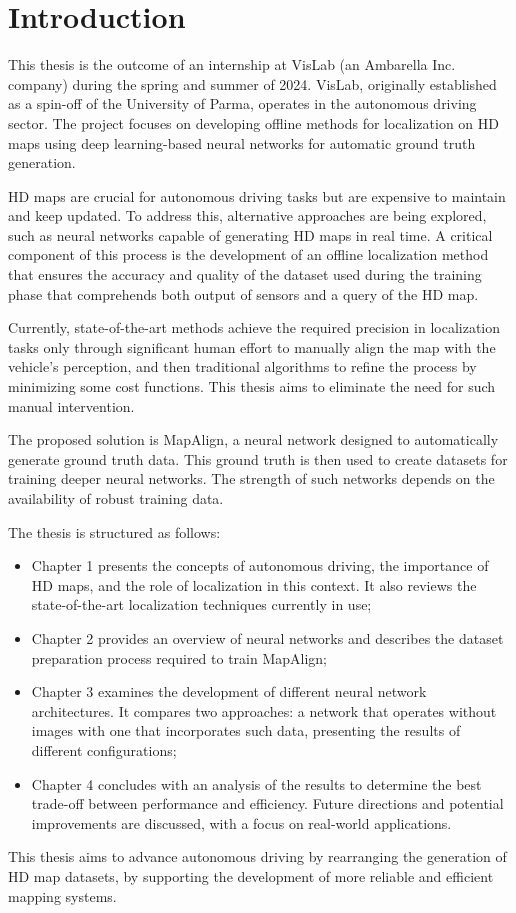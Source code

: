 \chapter*{Introduction}

This thesis is the outcome of an internship at VisLab (an Ambarella Inc. company) during the spring and summer of 2024. VisLab, originally established as a spin-off of the University of Parma, operates in the autonomous driving sector. The project focuses on developing offline methods for localization on HD maps using deep learning-based neural networks for automatic ground truth generation.

HD maps are crucial for autonomous driving tasks but are expensive to maintain and keep updated. To address this, alternative approaches are being explored, such as neural networks capable of generating HD maps in real time. A critical component of this process is the development of an offline localization method that ensures the accuracy and quality of the dataset used during the training phase that comprehends both output of sensors and a query of the HD map.

Currently, state-of-the-art methods achieve the required precision in localization tasks only through significant human effort to manually align the map with the vehicle’s perception, and then traditional algorithms to refine the process by minimizing some cost functions. This thesis aims to eliminate the need for such manual intervention.

The proposed solution is MapAlign, a neural network designed to automatically generate ground truth data. This ground truth is then used to create datasets for training deeper neural networks. The strength of such networks depends on the availability of robust training data.

The thesis is structured as follows:
\begin{itemize}
    \item Chapter 1 presents the concepts of autonomous driving, the importance of HD maps, and the role of localization in this context. It also reviews the state-of-the-art localization techniques currently in use;
    \item Chapter 2 provides an overview of neural networks and describes the dataset preparation process required to train MapAlign;
    \item Chapter 3 examines the development of different neural network architectures. It compares two approaches: a network that operates without images with one that incorporates such data, presenting the results of different configurations;
    \item Chapter 4 concludes with an analysis of the results to determine the best trade-off between performance and efficiency. Future directions and potential improvements are discussed, with a focus on real-world applications.

\end{itemize}

This thesis aims to advance autonomous driving by rearranging the generation of HD map datasets, by supporting the development of more reliable and efficient mapping systems.
